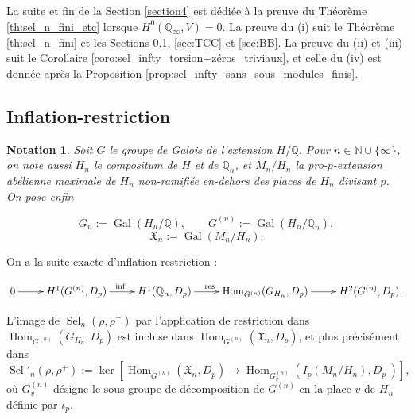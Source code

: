 \documentclass[12pt]{amsart}
\newcommand\bN{\mathbb{N}}
\newcommand\bQ{\mathbb{Q}}
\newcommand\cO{\mathcal{O}}
\newcommand\gX{\mathfrak{X}}
\newcommand{\res}{\mathrm{res}}
\DeclareMathOperator{\Gal}{Gal}
\DeclareMathOperator{\Hom}{Hom}
\DeclareMathOperator{\Sel}{Sel}
\theoremstyle{defstyle}
\newtheorem{notation}[subsubsection]{Notation}
\theoremstyle{thmstyle}
\begin{document}
La suite et fin de la Section \ref{section4} est dédiée à la preuve du Théorème \ref{th:sel_n_fini_etc} lorsque $H^0(\bQ_\infty,V)=0$. La preuve du (i) suit le Théorème \ref{th:sel_n_fini} et les Sections \ref{sec:isom_de_restriction},  \ref{sec:TCC} et \ref{sec:BB}. La preuve du (ii) et (iii) suit le Corollaire \ref{coro:sel_infty_torsion+zéros_triviaux}, et celle du (iv) est donnée après la Proposition \ref{prop:sel_infty_sans_sous_modules_finis}.

\subsection{Inflation-restriction}\label{sec:isom_de_restriction}
\begin{notation}
	Soit $G$ le groupe de Galois de l'extension $H/\bQ$. Pour $n\in \bN \cup \{\infty\}$, on note aussi $H_n$ le compositum de $H$ et de $\bQ_n$, et $M_n/H_n$ la pro-$p$-extension abélienne maximale de $H_n$ non-ramifiée en-dehors des places de $H_n$ divisant $p$. On pose enfin
	
	\[G_n:=\Gal(H_n/\bQ), \qquad G^{(n)}:=\Gal(H_n/\bQ_n), \]
	\[ \gX_n:=\Gal(M_n/H_n). \]
	
\end{notation} 



On a la suite exacte d'inflation-restriction :

$$\xymatrix{ 
	0 \ar[r] & H^1(G^{(n)},D_p) \ar[r]^{\inf} & H^1(\bQ_n,D_p)  \ar[r]^{\res \quad} & \Hom_{G^{(n)}}(G_{H_n},D_p) \ar[r] & H^2(G^{(n)},D_p).  
} $$

L'image de $\Sel_n(\rho,\rho^+)$ par l'application de restriction dans $\Hom_{G^{(n)}}(G_{H_n},D_p)$ est incluse dans $\Hom_{G^{(n)}}(\gX_n,D_p)$, et plus précisément dans 
$$\Sel'_n(\rho,\rho^+):= \ker \left[ \Hom_{G^{(n)}}(\gX_n,D_p) \longrightarrow \Hom_{G^{(n)}_v}(I_p(M_n/H_n),D_p^-) \right],$$
où $G^{(n)}_v$ désigne le sous-groupe de décomposition de $G^{(n)}$ en la place $v$ de $H_n$ définie par $\iota_p$.
\end{document}
